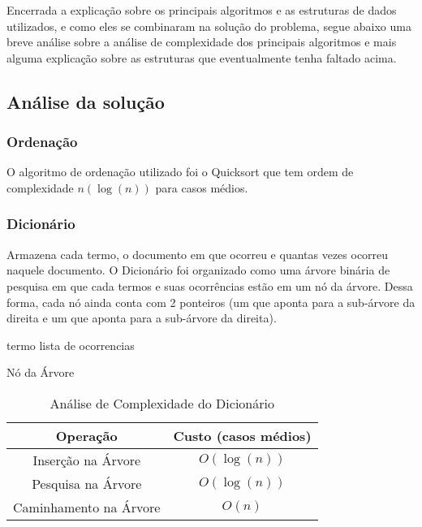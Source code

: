 \documentclass[12pt]{article}
\begin{document}
Encerrada a explicação sobre os principais algoritmos e as estruturas de dados
utilizados, e como eles se combinaram na solução do problema, segue abaixo uma
breve análise sobre a análise de complexidade dos principais algoritmos e mais
alguma explicação sobre as estruturas que eventualmente tenha faltado acima.

\subsection{Análise da solução}

\subsubsection{Ordenação}
O algoritmo de ordenação utilizado foi o Quicksort que tem ordem de complexidade
$n(\log(n))$ para casos médios.

\subsubsection{Dicionário}
Armazena cada termo, o documento em que ocorreu e quantas
vezes ocorreu naquele documento. O Dicionário foi organizado como uma árvore 
binária de pesquisa em que cada termos e suas ocorrências estão em um nó da 
árvore. Dessa forma, cada nó ainda conta com 2 ponteiros (um que aponta para 
a sub-árvore da direita e um que aponta para a sub-árvore da direita).

\begin{algorithm}[h!]
\begin{footnotesize}
	termo\;
	lista de ocorrencias\;
\caption{Nó da Árvore}
\end{footnotesize}
\end{algorithm}

\begin{table}[ht]
  \caption{Análise de Complexidade do Dicionário}
  \centering
  \begin{footnotesize}
  \begin{tabular}{c c}
  \hline\hline
  Operação & Custo (casos médios) \\
  \hline
  Inserção na Árvore & $O(\log(n))$ \\
  Pesquisa na Árvore & $O(\log(n))$ \\
  Caminhamento na Árvore & $O(n)$ \\
  \hline
  \end{tabular}
  \end{footnotesize}
\end{table}
\end{document}
